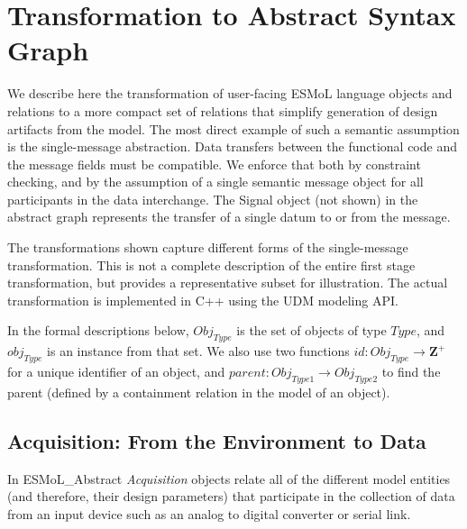\section{Transformation to Abstract Syntax Graph}

We describe here the transformation of user-facing ESMoL language objects and
relations to a more compact set of relations that simplify generation of design
artifacts from the model.  The most direct example of such a semantic assumption
is the single-message abstraction.  Data transfers between the functional code
and the message fields must be compatible. We enforce that both by constraint
checking, and by the assumption of a single semantic message object for all
participants in the data interchange.  The Signal object (not shown) in the
abstract graph represents the transfer of a single datum to or from the message.

The transformations shown capture different forms of the
single-message transformation.  This is not a complete description of the
entire first stage transformation, but provides a representative subset for
illustration. The actual transformation is implemented in C++ using the UDM
modeling API\cite{mic:udm}.

In the formal descriptions below, $Obj_{Type}$ is the set of objects of type $Type$, and
$obj_{Type}$ is an instance from that set.  We also
use two functions $id: Obj_{Type} \rightarrow \mathbf{Z}^{+}$ for a unique
identifier of an object, and $parent: Obj_{Type1} \rightarrow Obj_{Type2}$ to
find the parent (defined by a containment relation in the model of an object).

\subsection{Acquisition: From the Environment to Data}

In ESMoL\_Abstract \emph{Acquisition} objects relate all of the different model entities (and
therefore, their design parameters) that participate in the collection of data
from an input device such as an analog to digital converter or serial link.

